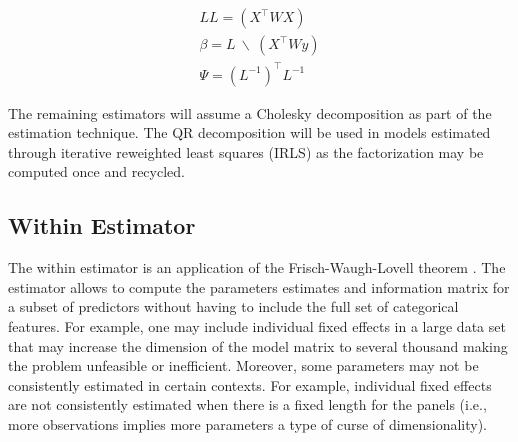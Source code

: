\documentclass{juliacon}
\begin{document}
\begin{equation}
\label{Cholesky}
\begin{split}
	LL = \left( X^{\top} W X \right) \\
	\beta = L \ \backslash \ \left( X^{\top} W y \right) \\
	\Psi = \left( L^{-1}\right)^{\top} L^{-1}
\end{split}
\end{equation}

The remaining estimators will assume a Cholesky decomposition as part of the estimation technique. The QR decomposition will be used in models estimated through iterative reweighted least squares (IRLS) as the factorization may be computed once and recycled.

\subsection{Within Estimator}

The within estimator is an application of the Frisch-Waugh-Lovell theorem \cite{FWL, FWLProof}. The estimator allows to compute the parameters estimates and information matrix for a subset of predictors without having to include the full set of categorical features. For example, one may include individual fixed effects in a large data set that may increase the dimension of the model matrix to several thousand making the problem unfeasible or inefficient. Moreover, some parameters may not be consistently estimated in certain contexts. For example, individual fixed effects are not consistently estimated when there is a fixed length for the panels (i.e., more observations implies more parameters a type of curse of dimensionality).
\end{document}
